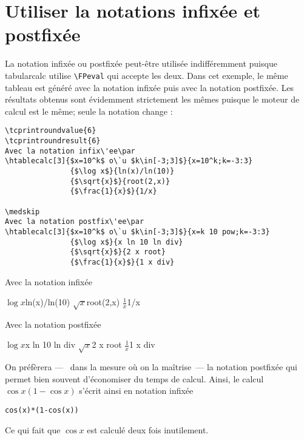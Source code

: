\documentclass[a4paper,10pt]{article}
\newcommand\tbcalc{\textsf{tabularcalc}\xspace}
\newcommand\mywidth{0.85\linewidth}
\begin{document}
\section{Utiliser la notations infixée et postfixée}
La notation infixée ou postfixée peut-être utilisée indifféremment puisque \tbcalc utilise \verb=\FPeval= qui accepte les deux. Dans cet exemple, le même tableau est généré avec la notation infixée puis avec la notation postfixée. Les résultats obtenus sont évidemment strictement les mêmes puisque le moteur de calcul est le même; seule la notation change :
\begin{center}
\begin{minipage}{\mywidth}
\begin{lstlisting}
\tcprintroundvalue{6}
\tcprintroundresult{6}
Avec la notation infix\'ee\par
\htablecalc[3]{$x=10^k$ o\`u $k\in[-3;3]$}{x=10^k;k=-3:3}
               {$\log x$}{ln(x)/ln(10)}
               {$\sqrt{x}$}{root(2,x)}
               {$\frac{1}{x}$}{1/x}

\medskip
Avec la notation postfix\'ee\par
\htablecalc[3]{$x=10^k$ o\`u $k\in[-3;3]$}{x=k 10 pow;k=-3:3}
               {$\log x$}{x ln 10 ln div}
               {$\sqrt{x}$}{2 x root}
               {$\frac{1}{x}$}{1 x div}
\end{lstlisting}
\end{minipage}

Avec la notation infix\'ee\par\nobreak
{}
               {$\log x$}{ln(x)/ln(10)}
               {$\sqrt{x}$}{root(2,x)}
               {$\frac{1}{x}$}{1/x}

\medskip
Avec la notation postfix\'ee\par
{}
               {$\log x$}{x ln 10 ln div}
               {$\sqrt{x}$}{2 x root}
               {$\frac{1}{x}$}{1 x div}
\end{center}
On préfèrera ---~ dans la mesure où on la maîtrise~--- la notation postfixée qui permet bien souvent d'économiser du temps de calcul. Ainsi, le calcul $\cos x(1-\cos x)$ s'écrit ainsi en notation infixée
\begin{center}
\begin{minipage}{\mywidth}
\begin{lstlisting}
cos(x)*(1-cos(x))
\end{lstlisting}
\end{minipage}
\end{center}
Ce qui fait que $\cos x$ est calculé deux fois inutilement.\smallskip
\end{document}
